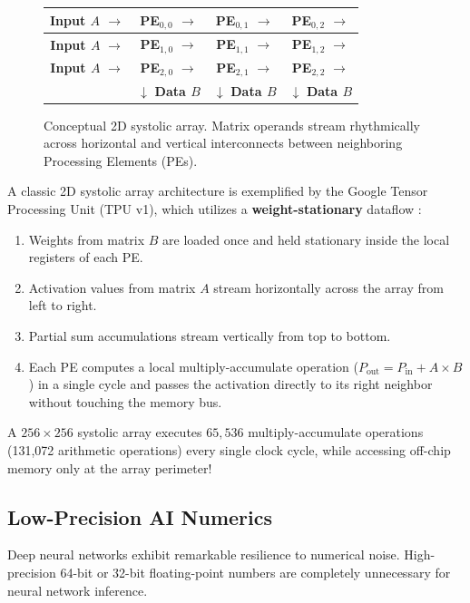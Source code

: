 \begin{figure}[htbp]
  \begin{center}
    \small
    \begin{tabular}{|c|c|c|c|}
      \hline
      \textbf{Input $A$} $\to$ & \textbf{PE}$_{0,0}$ $\to$ & \textbf{PE}$_{0,1}$ $\to$ & \textbf{PE}$_{0,2}$ $\to$ \\ \hline
      \textbf{Input $A$} $\to$ & \textbf{PE}$_{1,0}$ $\to$ & \textbf{PE}$_{1,1}$ $\to$ & \textbf{PE}$_{1,2}$ $\to$ \\ \hline
      \textbf{Input $A$} $\to$ & \textbf{PE}$_{2,0}$ $\to$ & \textbf{PE}$_{2,1}$ $\to$ & \textbf{PE}$_{2,2}$ $\to$ \\ \hline
      & $\downarrow$ \textbf{Data $B$} & $\downarrow$ \textbf{Data $B$} & $\downarrow$ \textbf{Data $B$} \\ \hline
    \end{tabular}
    \caption{Conceptual 2D systolic array. Matrix operands stream rhythmically across horizontal and vertical interconnects between neighboring Processing Elements (PEs).}
    \label{fig:systolic_array}
  \end{center}
\end{figure}

A classic 2D systolic array architecture is exemplified by the Google Tensor Processing Unit (TPU v1), which utilizes a \textbf{weight-stationary} dataflow \cite{jouppi2017indatacenter}:
\begin{enumerate}
    \item Weights from matrix $B$ are loaded once and held stationary inside the local registers of each PE.
    \item Activation values from matrix $A$ stream horizontally across the array from left to right.
    \item Partial sum accumulations stream vertically from top to bottom.
    \item Each PE computes a local multiply-accumulate operation ($P_{\text{out}} = P_{\text{in}} + A \times B$) in a single cycle and passes the activation directly to its right neighbor without touching the memory bus.
\end{enumerate}
A $256 \times 256$ systolic array executes $65,536$ multiply-accumulate operations (131,072 arithmetic operations) every single clock cycle, while accessing off-chip memory only at the array perimeter!

\subsection{Low-Precision AI Numerics}
Deep neural networks exhibit remarkable resilience to numerical noise. High-precision 64-bit or 32-bit floating-point numbers are completely unnecessary for neural network inference.

